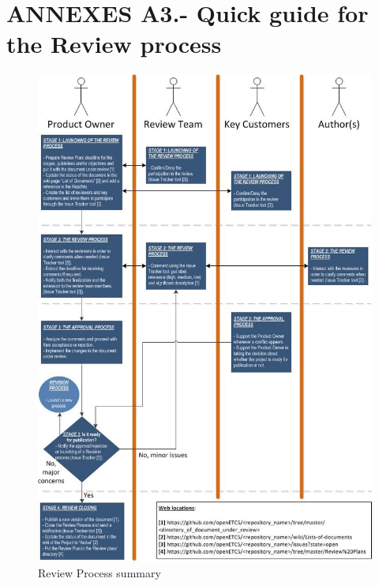 \documentclass{template/openetcs_article}
\begin{document}
\section{ANNEXES A3.- Quick guide for the Review process}

\begin{figure}[H]
\centering
\includegraphics[scale=0.83]{./figures/ReviewProcessSummary.JPG}
\caption{Review Process summary}
\end{figure}
\end{document}
